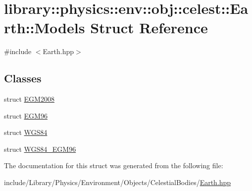 \hypertarget{structlibrary_1_1physics_1_1env_1_1obj_1_1celest_1_1_earth_1_1_models}{}\section{library\+:\+:physics\+:\+:env\+:\+:obj\+:\+:celest\+:\+:Earth\+:\+:Models Struct Reference}
\label{structlibrary_1_1physics_1_1env_1_1obj_1_1celest_1_1_earth_1_1_models}


{\ttfamily \#include $<$Earth.\+hpp$>$}

\subsection*{Classes}
\begin{DoxyCompactItemize}
\item 
struct \hyperlink{structlibrary_1_1physics_1_1env_1_1obj_1_1celest_1_1_earth_1_1_models_1_1_e_g_m2008}{E\+G\+M2008}
\item 
struct \hyperlink{structlibrary_1_1physics_1_1env_1_1obj_1_1celest_1_1_earth_1_1_models_1_1_e_g_m96}{E\+G\+M96}
\item 
struct \hyperlink{structlibrary_1_1physics_1_1env_1_1obj_1_1celest_1_1_earth_1_1_models_1_1_w_g_s84}{W\+G\+S84}
\item 
struct \hyperlink{structlibrary_1_1physics_1_1env_1_1obj_1_1celest_1_1_earth_1_1_models_1_1_w_g_s84___e_g_m96}{W\+G\+S84\+\_\+\+E\+G\+M96}
\end{DoxyCompactItemize}


The documentation for this struct was generated from the following file\+:\begin{DoxyCompactItemize}
\item 
include/\+Library/\+Physics/\+Environment/\+Objects/\+Celestial\+Bodies/\hyperlink{_objects_2_celestial_bodies_2_earth_8hpp}{Earth.\+hpp}\end{DoxyCompactItemize}
